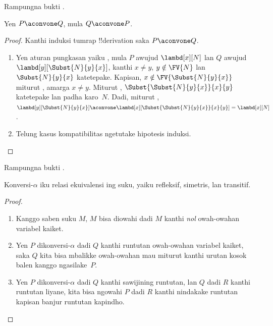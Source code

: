 \documentclass[../../../include/open-logic-section]{subfiles}
\begin{document}
\begin{prob}
  Rampungna bukti .
\end{prob}

\begin{lem}
  Yen $P \aconvone Q$, mula
  $Q \aconvone P$.
\end{lem}

\begin{proof}
  Kanthi induksi tumrap !!{derivation}
  saka $P \aconvone Q$.
  \begin{enumerate}
  \item Yen aturan pungkasan yaiku
    , mula
    $P$ awujud $\lambd[x][N]$
    lan $Q$ awujud
    $\lambd[y][\Subst{N}{y}{x}]$,
    kanthi $x \neq y$,
    $y \notin \FV{N}$ lan
    $\Subst{N}{y}{x}$ katetepake.
    Kapisan, $x \notin
    \FV{\Subst{N}{y}{x}}$ miturut
    , amarga
    $x \neq y$. Miturut
    ,
    $\Subst{\Subst{N}{y}{x}}{x}{y}$
    katetepake lan padha karo~$N$.
    Dadi, miturut
    ,
    $\lambd[y][\Subst{N}{y}{x}]
    \aconvone
    \lambd[x][\Subst{\Subst{N}{y}{x}}{x}{y}]
    = \lambd[x][N]$.
  \item Telung kasus kompatibilitas
    ngetutake hipotesis induksi.
  \end{enumerate}
\end{proof}

\begin{prob}
  Rampungna bukti .
\end{prob}

\begin{thm}
  Konversi-$\alpha$ iku relasi
  ekuivalensi ing suku, yaiku
  refleksif, simetris, lan transitif.
\end{thm}

\begin{proof}
  \begin{enumerate}
  \item Kanggo saben suku $M$,
    $M$ bisa diowahi dadi $M$
    kanthi \emph{nol} owah-owahan
    variabel kaiket.
  \item Yen $P$ dikonversi-$\alpha$
    dadi $Q$ kanthi runtutan owah-owahan
    variabel kaiket, saka $Q$ kita
    bisa mbalikke owah-owahan mau
    miturut 
    kanthi urutan kosok balen kanggo
    ngasilake~$P$.
  \item Yen $P$ dikonversi-$\alpha$
    dadi $Q$ kanthi sawijining runtutan,
    lan $Q$ dadi $R$ kanthi runtutan liyane,
    kita bisa ngowahi $P$ dadi $R$
    kanthi nindakake runtutan kapisan
    banjur runtutan kapindho.
  \end{enumerate}
\end{proof}
\end{document}
